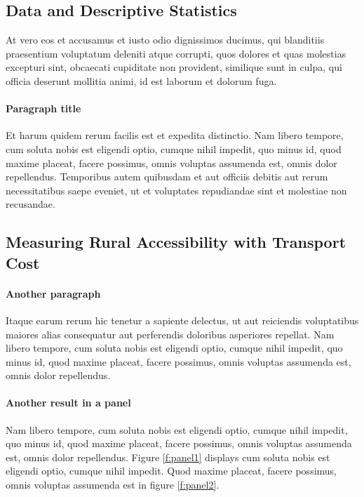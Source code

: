 \documentclass[letterpaper,12pt,leqno]{article}
\begin{document}
\subsection{Data and Descriptive Statistics}

At vero eos et accusamus et iusto odio dignissimos ducimus, qui blanditiis praesentium voluptatum deleniti atque corrupti, quos dolores et quas molestias excepturi sint, obcaecati cupiditate non provident, similique sunt in culpa, qui officia deserunt mollitia animi, id est laborum et dolorum fuga. 

\paragraph{Paragraph title} Et harum quidem rerum facilis est et expedita distinctio. Nam libero tempore, cum soluta nobis est eligendi optio, cumque nihil impedit, quo minus id, quod maxime placeat, facere possimus, omnis voluptas assumenda est, omnis dolor repellendus. Temporibus autem quibusdam et aut officiis debitis aut rerum necessitatibus saepe eveniet, ut et voluptates repudiandae sint et molestiae non recusandae. 

\subsection{Measuring Rural Accessibility with Transport Cost}

\paragraph{Another paragraph} Itaque earum rerum hic tenetur a sapiente delectus, ut aut reiciendis voluptatibus maiores alias consequatur aut perferendis doloribus asperiores repellat. Nam libero tempore, cum soluta nobis est eligendi optio, cumque nihil impedit, quo minus id, quod maxime placeat, facere possimus, omnis voluptas assumenda est, omnis dolor repellendus. 

\paragraph{Another result in a panel} Nam libero tempore, cum soluta nobis est eligendi optio, cumque nihil impedit, quo minus id, quod maxime placeat, facere possimus, omnis voluptas assumenda est, omnis dolor repellendus. Figure \ref{f:panel1} displays cum soluta nobis est eligendi optio, cumque nihil impedit. Quod maxime placeat, facere possimus, omnis voluptas assumenda est in figure \ref{f:panel2}.
\end{document}
